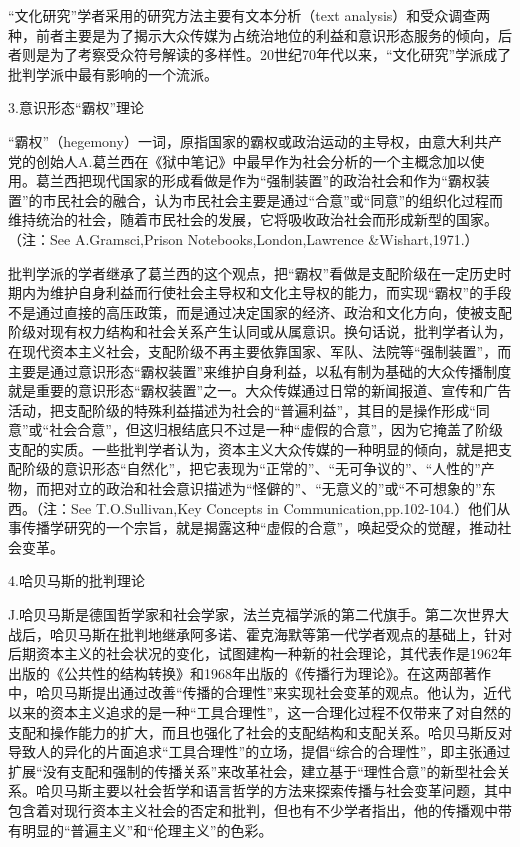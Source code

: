 \documentclass[UTF8,12pt]{ctexart}
\numberwithin{equation}{section} %
\numberwithin{figure}{section}
\numberwithin{table}{section}
\begin{document}
	“文化研究”学者采用的研究方法主要有文本分析（text analysis）和受众调查两种，前者主要是为了揭示大众传媒为占统治地位的利益和意识形态服务的倾向，后者则是为了考察受众符号解读的多样性。20世纪70年代以来，“文化研究”学派成了批判学派中最有影响的一个流派。
	
	3.意识形态“霸权”理论
	
	“霸权”（hegemony）一词，原指国家的霸权或政治运动的主导权，由意大利共产党的创始人A.葛兰西在《狱中笔记》中最早作为社会分析的一个主概念加以使用。葛兰西把现代国家的形成看做是作为“强制装置”的政治社会和作为“霸权装置”的市民社会的融合，认为市民社会主要是通过“合意”或“同意”的组织化过程而维持统治的社会，随着市民社会的发展，它将吸收政治社会而形成新型的国家。（注：See A.Gramsci,Prison Notebooks,London,Lawrence \&Wishart,1971.）
	
	批判学派的学者继承了葛兰西的这个观点，把“霸权”看做是支配阶级在一定历史时期内为维护自身利益而行使社会主导权和文化主导权的能力，而实现“霸权”的手段不是通过直接的高压政策，而是通过决定国家的经济、政治和文化方向，使被支配阶级对现有权力结构和社会关系产生认同或从属意识。换句话说，批判学者认为，在现代资本主义社会，支配阶级不再主要依靠国家、军队、法院等“强制装置”，而主要是通过意识形态“霸权装置”来维护自身利益，以私有制为基础的大众传播制度就是重要的意识形态“霸权装置”之一。大众传媒通过日常的新闻报道、宣传和广告活动，把支配阶级的特殊利益描述为社会的“普遍利益”，其目的是操作形成“同意”或“社会合意”，但这归根结底只不过是一种“虚假的合意”，因为它掩盖了阶级支配的实质。一些批判学者认为，资本主义大众传媒的一种明显的倾向，就是把支配阶级的意识形态“自然化”，把它表现为“正常的”、“无可争议的”、“人性的”产物，而把对立的政治和社会意识描述为“怪僻的”、“无意义的”或“不可想象的”东西。（注：See T.O.Sullivan,Key Concepts in Communication,pp.102-104.）他们从事传播学研究的一个宗旨，就是揭露这种“虚假的合意”，唤起受众的觉醒，推动社会变革。
	
	4.哈贝马斯的批判理论
	
	J.哈贝马斯是德国哲学家和社会学家，法兰克福学派的第二代旗手。第二次世界大战后，哈贝马斯在批判地继承阿多诺、霍克海默等第一代学者观点的基础上，针对后期资本主义的社会状况的变化，试图建构一种新的社会理论，其代表作是1962年出版的《公共性的结构转换》和1968年出版的《传播行为理论》。在这两部著作中，哈贝马斯提出通过改善“传播的合理性”来实现社会变革的观点。他认为，近代以来的资本主义追求的是一种“工具合理性”，这一合理化过程不仅带来了对自然的支配和操作能力的扩大，而且也强化了社会的支配结构和支配关系。哈贝马斯反对导致人的异化的片面追求“工具合理性”的立场，提倡“综合的合理性”，即主张通过扩展“没有支配和强制的传播关系”来改革社会，建立基于“理性合意”的新型社会关系。哈贝马斯主要以社会哲学和语言哲学的方法来探索传播与社会变革问题，其中包含着对现行资本主义社会的否定和批判，但也有不少学者指出，他的传播观中带有明显的“普遍主义”和“伦理主义”的色彩。
	
\end{document}
